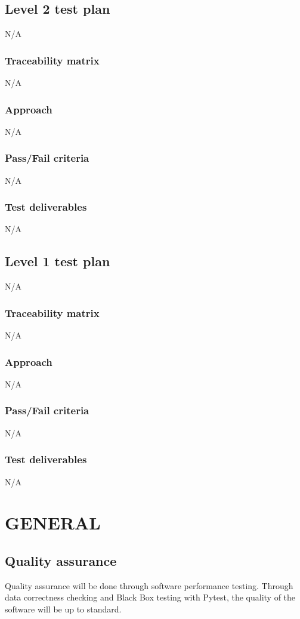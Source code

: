 \documentclass[letterpaper,12pt,oneside,listof=totoc]{scrreprt}
\begin{document}
\section{Level 2 test plan}
N/A
\subsection{Traceability matrix}
N/A
\subsection{Approach}
N/A
\subsection{Pass/Fail criteria}
N/A
\subsection{Test deliverables}
N/A
\section{Level 1 test plan}
N/A
\subsection{Traceability matrix}
N/A
\subsection{Approach}
N/A
\subsection{Pass/Fail criteria}
N/A
\subsection{Test deliverables}
N/A


\chapter{GENERAL}

\section{Quality assurance}

Quality assurance will be done through software performance testing. Through data correctness checking and Black Box testing with Pytest, the quality of the software will be up to standard.
\end{document}
